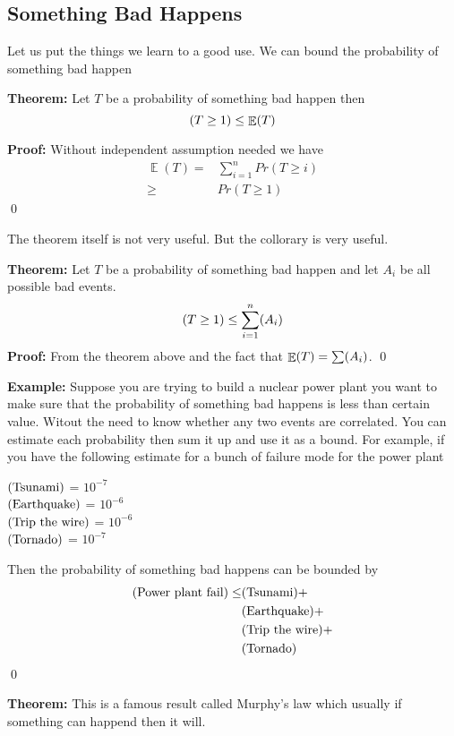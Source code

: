 \documentclass[a4paper, 12pt]{article}
\newcommand{\theorem}{\vspace{1em}\noindent\textbf{Theorem:} }
\newcommand{\example}{\vspace{1em}\noindent\textbf{Example:} }
\renewcommand{\proof}{\vspace{0.5em}\noindent\textbf{Proof:} }
\newcommand{\qedd}{\qed\newline}
\let\Pr\relax
\DeclareMathOperator{\Pr}{Pr}
\DeclareMathOperator{\E}{\mathbb{E}}
\begin{document}
\begin{multicols}{2}
\section*{Something Bad Happens}

Let us put the things we learn to a good use. We can bound the probability of something bad happen

\theorem Let $T$ be a probability of something bad happen then
\[
	\Pr(T \ge 1) \le \E(T)
\]

\proof Without independent assumption needed  we have
\begin{align*}
	\E(T) =& \sum_{i=1}^{n} Pr(T \ge i)\\
	\ge& Pr(T \ge 1)
\end{align*}
	\qedd
	
The theorem itself is not very useful. But the collorary is very useful.

\theorem Let $T$ be a probability of something bad happen and let $A_i$ be all possible bad events.
\[
	\Pr(T \ge 1) \le \sum_{i=1}^{n} \Pr(A_i)
\]
\proof From the theorem above and the fact that $\E(T) = \sum \Pr(A_i)$.
\qedd

\example Suppose you are trying to build a nuclear power plant you want to make sure that the probability of something bad happens is less than certain value. Witout the need to know whether any two events are correlated. You can estimate each probability then sum it up and use it as a bound. For example, if you have the following estimate for a bunch of failure mode for the power plant
\begin{center}
	$\Pr(\text{Tsunami})$ = $10^{-7}$\\
	$\Pr(\text{Earthquake})$ = $10^{-6}$\\
	$\Pr(\text{Trip the wire})$ = $10^{-6}$\\
	$\Pr(\text{Tornado})$ = $10^{-7}$\\
\end{center}
Then the probability of something bad happens can be bounded by
\begin{align*}
	\Pr(\text{Power plant fail}) \le& \Pr(\text{Tsunami}) +\\ &\Pr(\text{Earthquake}) +\\
	& \Pr(\text{Trip the wire}) + \\
	&\Pr(\text{Tornado})\\
\end{align*}
\qedd

\theorem This is a famous result called Murphy's law which usually if something can happend then it will.


\end{multicols}
\end{document}
